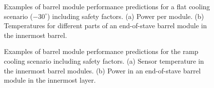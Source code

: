 \begin{figure}[ht]
\centering
{}\quad\quad
{}
\caption{Examples of barrel module performance predictions for a flat cooling scenario ($-30^\circ$) including safety factors. (a) Power per module. (b) Temperatures for different parts of an end-of-stave barrel module in the innermost barrel.}
\label{fig:moduleflatperformance}
\end{figure}

\begin{figure}[ht]
\centering
{}\quad\quad
{}
\caption{Examples of barrel module performance predictions for the ramp cooling scenario including safety factors. (a) Sensor temperature in the innermost barrel modules. (b) Power in an end-of-stave barrel module in the innermost layer.}
\label{fig:modulerampperformance}
\end{figure}

